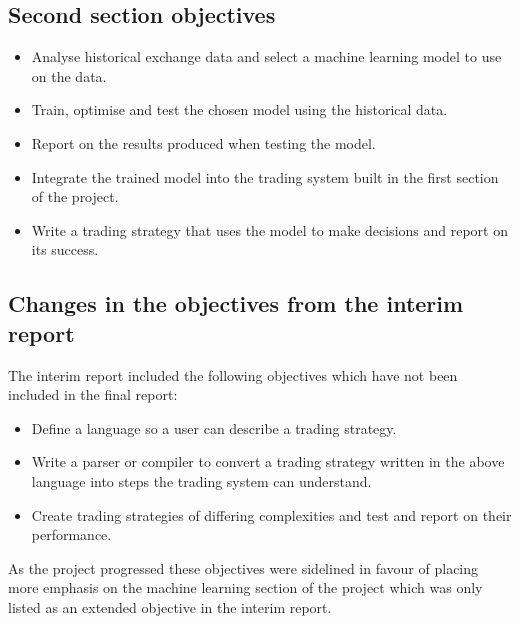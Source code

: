 \subsection{Second section objectives}

	\begin{itemize}
		\item Analyse historical exchange data and select a machine learning model to use on the data.
		\item Train, optimise and test the chosen model using the historical data.
		\item Report on the results produced when testing the model. 
		\item Integrate the trained model into the trading system built in the first section of the project.
		\item Write a trading strategy that uses the model to make decisions and report on its success.
	\end{itemize}		
	
\subsection{Changes in the objectives from the interim report}

The interim report included the following objectives which have not been included in the final report:

	\begin{itemize}
		\item Define a language so a user can describe a trading strategy.
		\item Write a parser or compiler to convert a trading strategy written in the above language into steps the trading system can understand.
		\item Create trading strategies of differing complexities and test and report on their performance.
	\end{itemize}
	
As the project progressed these objectives were sidelined in favour of placing more emphasis on the machine learning section of the project which was only listed as an extended objective in the interim report.